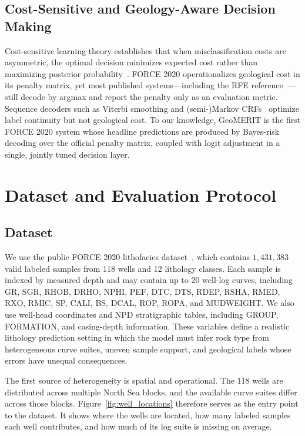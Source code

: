 \documentclass[bdcc,article,submit,pdftex,moreauthors]{Definitions/mdpi}
\begin{document}
\subsection{Cost-Sensitive and Geology-Aware Decision Making}
Cost-sensitive learning theory establishes that when misclassification costs are asymmetric,
the optimal decision minimizes expected cost rather than maximizing posterior
probability~\cite{elkan2001cost,berger1985decision,andrade2019bayes,zadrozny2002multiclass}.
FORCE 2020 operationalizes geological cost in its penalty matrix, yet most published
systems---including the RFE reference~\cite{chen2026rfe}---still decode by argmax and report
the penalty only as an evaluation metric. Sequence decoders such as Viterbi smoothing and
(semi-)Markov CRFs~\cite{viterbi1967,lafferty2001crf,sarawagi2004semimarkov} optimize label
continuity but not geological cost. To our knowledge, GeoMERIT is the first FORCE 2020 system
whose headline predictions are produced by Bayes-risk decoding over the official penalty
matrix, coupled with logit adjustment in a single, jointly tuned decision layer.

\section{Dataset and Evaluation Protocol}
\label{sec:data}

\subsection{Dataset}
\label{sec:dataset}
We use the public FORCE 2020 lithofacies dataset~\cite{bormann2020force}, which contains
$1{,}431{,}383$ valid labeled samples from 118 wells and 12 lithology classes. Each sample is
indexed by measured depth and may contain up to 20 well-log curves, including GR, SGR, RHOB,
DRHO, NPHI, PEF, DTC, DTS, RDEP, RSHA, RMED, RXO, RMIC, SP, CALI, BS, DCAL, ROP, ROPA, and
MUDWEIGHT. We also use well-head coordinates and NPD stratigraphic tables, including GROUP,
FORMATION, and casing-depth information. These variables define a realistic lithology
prediction setting in which the model must infer rock type from heterogeneous curve suites,
uneven sample support, and geological labels whose errors have unequal consequences.

The first source of heterogeneity is spatial and operational. The 118 wells are distributed
across multiple North Sea blocks, and the available curve suites differ across those blocks.
Figure~\ref{fig:well_locations} therefore serves as the entry point to the dataset. It shows
where the wells are located, how many labeled samples each well contributes, and how much of
its log suite is missing on average.
\end{document}
